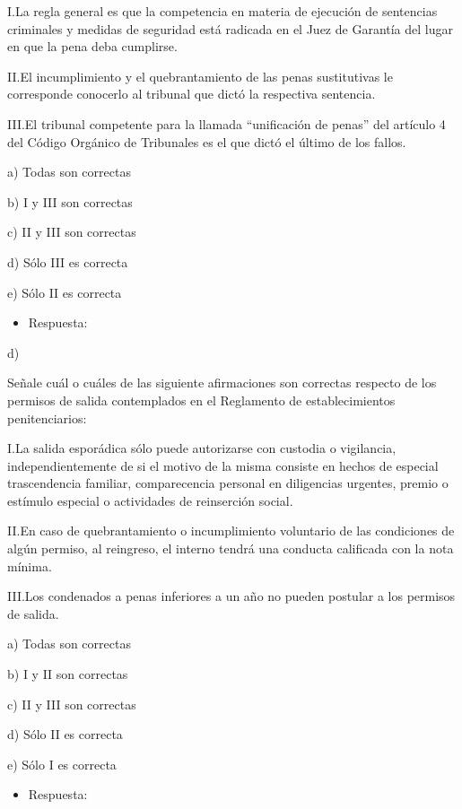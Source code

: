 \documentclass[letterpaper, 11pt]{article}
\begin{document}
I.La regla general es que la competencia en materia de ejecución de
sentencias criminales y medidas de seguridad está radicada en el Juez
de Garantía del lugar en que la pena deba cumplirse.

II.El incumplimiento y el quebrantamiento de las penas sustitutivas le
corresponde conocerlo al tribunal que dictó la respectiva sentencia.


III.El tribunal competente para la llamada “unificación de penas” del
artículo 4 del Código Orgánico de Tribunales es el que dictó el último
de los fallos.


a) Todas son correctas

b) I y III son correctas

c) II y III son correctas

d) Sólo III es correcta

e) Sólo II es correcta


\begin{itemize}
\item Respuesta:
\end{itemize}

d)


Señale cuál o cuáles de las siguiente afirmaciones son correctas
respecto de los permisos de salida contemplados en el Reglamento de
establecimientos penitenciarios:


I.La salida esporádica sólo puede autorizarse con custodia o
vigilancia, independientemente de si el motivo de la misma consiste en
hechos de especial trascendencia familiar, comparecencia personal en
diligencias urgentes, premio o estímulo especial o actividades de
reinserción social.

II.En caso de quebrantamiento o incumplimiento voluntario de las
condiciones de algún permiso, al reingreso, el interno tendrá una
conducta calificada con la nota mínima.

III.Los condenados a penas inferiores a un año no pueden postular a
los permisos de salida.


a) Todas son correctas

b) I y II son correctas

c) II y III son correctas

d) Sólo II es correcta

e) Sólo I es correcta


\begin{itemize}
\item Respuesta:
\end{itemize}
\end{document}
